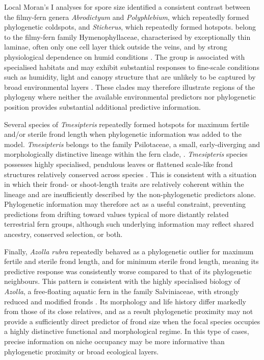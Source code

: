 \documentclass[preprint,12pt,authoryear]{elsarticle}
\begin{document}
Local Moran’s I analyses for spore size identified a consistent contrast between the filmy-fern genera \textit{Abrodictyum} and \textit{Polyphlebium}, which repeatedly formed phylogenetic coldspots, and \textit{Sticherus}, which repeatedly formed hotspots. belong to the filmy-fern family Hymenophyllaceae, characterised by exceptionally thin laminae, often only one cell layer thick outside the veins, and by strong physiological dependence on humid conditions \citep{dubuisson2003rbc}. The group is associated with specialised habitats and may exhibit substantial responses to fine-scale conditions such as humidity, light and canopy structure that are unlikely to be captured by broad environmental layers \citep{dong2024formation, parra2009vertical, perrie2013hymenophyllum, proctor2012light, yu2023adaptational, wang2021effects}. These clades may therefore illustrate regions of the phylogeny where neither the available environmental predictors nor phylogenetic position provides substantial additional predictive information.

Several species of \textit{Tmesipteris} repeatedly formed hotspots for maximum fertile and/or sterile frond length when phylogenetic information was added to the model. \textit{Tmesipteris} belongs to the family Psilotaceae, a small, early-diverging and morphologically distinctive lineage within the fern clade, \citep{shen2018large}. \textit{Tmesipteris} species possesses highly specialised, pendulous leaves or flattened scale-like frond structures relatively conserved across species \citep{fernandez2026phylogenomic, wei2025resolving}. This is consistent with a situation in which their frond- or shoot-length traits are relatively coherent within the lineage and are insufficiently described by the non-phylogenetic predictors alone. Phylogenetic information may therefore act as a useful constraint, preventing predictions from drifting toward values typical of more distantly related terrestrial fern groups, although such underlying information may reflect shared ancestry, conserved selection, or both.

Finally, \textit{Azolla rubra} repeatedly behaved as a phylogenetic outlier for maximum fertile and sterile frond length, and for minimum sterile frond length, meaning its predictive response was consistently worse compared to that of its phylogenetic neighbours. This pattern is consistent with the highly specialised biology of \textit{Azolla}, a free-floating aquatic fern in the family Salviniaceae, with strongly reduced and modified fronds \citep{brownsey2014flora}. Its morphology and life history differ markedly from those of its close relatives, and as a result phylogenetic proximity may not provide a sufficiently direct predictor of frond size when the focal species occupies a highly distinctive functional and morphological regime. In this type of cases, precise information on niche occupancy may be more informative than phylogenetic proximity or broad ecological layers.
\end{document}
